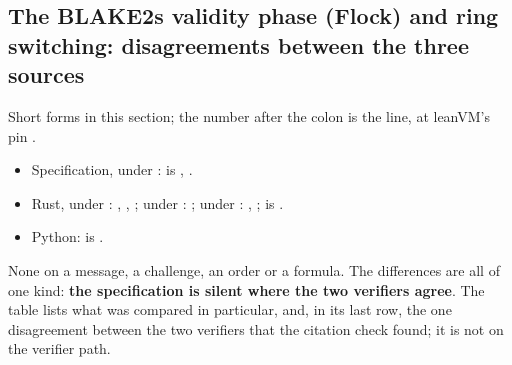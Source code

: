 \subsection{The BLAKE2s validity phase (Flock) and ring switching: disagreements between the three sources}\label{sec:gen-flock-ring-disagreements}

\begin{sloppypar}
Short forms in this section; the number after the colon is the line, at leanVM's pin
.
\begin{itemize}
\item Specification, under :  is
  ,  .
\item Rust, under : , , ;
  under : ; under :
  , ;  is
  .
\item Python:  is .
\end{itemize}
\end{sloppypar}

None on a message, a challenge, an order or a formula. The differences are all of one kind:
\textbf{the specification is silent where the two verifiers agree}. The table lists what was
compared in particular, and, in its last row, the one disagreement between the two verifiers that
the citation check found; it is not on the verifier path.

